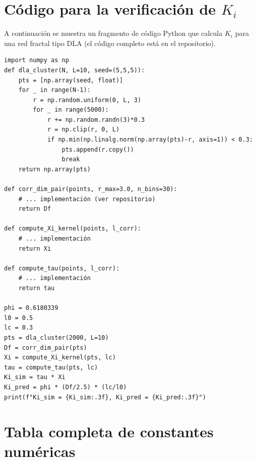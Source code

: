 \documentclass[12pt, a4paper]{article}
\theoremstyle{miuThm}
\theoremstyle{remark}
\begin{document}
\clearpage
\section{Código para la verificación de $K_i$}
\label{app:codigo_Ki}

A continuación se muestra un fragmento de código Python que calcula $K_i$ para una red fractal tipo DLA (el código completo está en el repositorio).

\begin{verbatim}
import numpy as np
def dla_cluster(N, L=10, seed=(5,5,5)):
    pts = [np.array(seed, float)]
    for _ in range(N-1):
        r = np.random.uniform(0, L, 3)
        for _ in range(5000):
            r += np.random.randn(3)*0.3
            r = np.clip(r, 0, L)
            if np.min(np.linalg.norm(np.array(pts)-r, axis=1)) < 0.3:
                pts.append(r.copy())
                break
    return np.array(pts)

def corr_dim_pair(points, r_max=3.0, n_bins=30):
    # ... implementación (ver repositorio)
    return Df

def compute_Xi_kernel(points, l_corr):
    # ... implementación
    return Xi

def compute_tau(points, l_corr):
    # ... implementación
    return tau

phi = 0.6180339
l0 = 0.5
lc = 0.3
pts = dla_cluster(2000, L=10)
Df = corr_dim_pair(pts)
Xi = compute_Xi_kernel(pts, lc)
tau = compute_tau(pts, lc)
Ki_sim = tau * Xi
Ki_pred = phi * (Df/2.5) * (lc/l0)
print(f"Ki_sim = {Ki_sim:.3f}, Ki_pred = {Ki_pred:.3f}")
\end{verbatim}


\clearpage
\section{Tabla completa de constantes numéricas}
\label{app:constantes}
\end{document}
